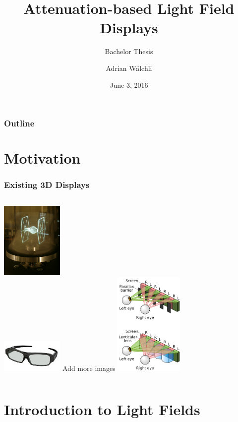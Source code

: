 \documentclass[12pt, compress]{beamer}
\title{Attenuation-based Light Field Displays}
\subtitle{Bachelor Thesis}
\date{June 3, 2016}
\author{Adrian W\"alchli}
\institute{Institut f\"ur Informatik und angewandte Mathematik}
\begin{document}
\setlength{\leftmargini}{0pt}
\setlength{\fboxsep}{0pt}%

\maketitle

\begin{frame}[fragile]
	\frametitle{Outline}
	\tableofcontents
\end{frame}

\section{Motivation}

\begin{frame}[fragile]
	\frametitle{Existing 3D Displays}
	\begin{columns}
			\includegraphics[width=3cm]{images/360_deg_display}
			\\
			\includegraphics[width=3cm]{images/3d_glasses}
			Add more images
			\includegraphics[height=5cm]{images/parallax_barrier_vs_lenticular}
	\end{columns}
\end{frame}

\section{Introduction to Light Fields}
\end{document}
